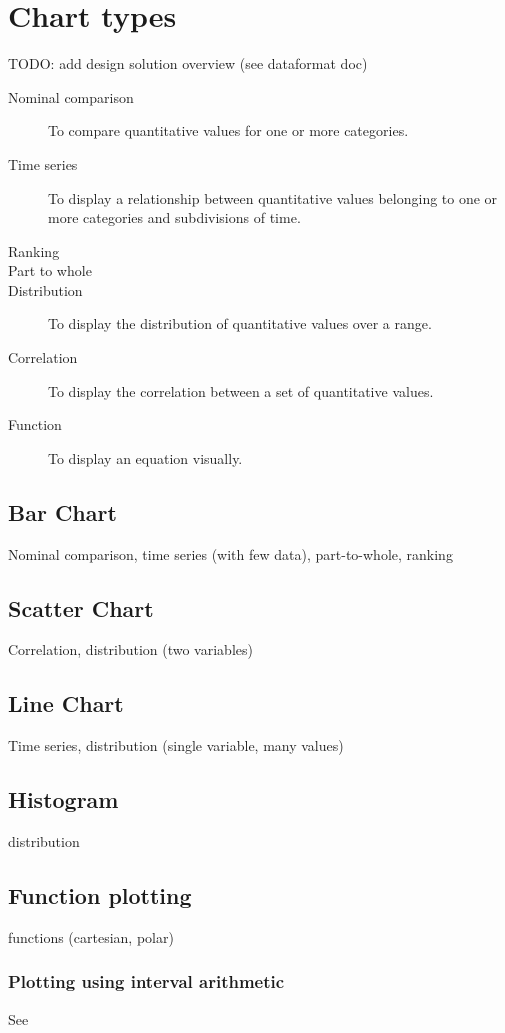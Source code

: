 \chapter{Chart types}

TODO: add design solution overview (see dataformat doc)
\begin{description}
\item[Nominal comparison] To compare quantitative values for one or more categories.
\item[Time series] To display a relationship between quantitative values belonging to one or more categories and subdivisions of time.
\item[Ranking]
\item[Part to whole]
\item[Distribution] To display the distribution of quantitative values over a range.
\item[Correlation] To display the correlation between a set of quantitative values.
\item[Function] To display an equation visually.
\end{description}

\section{Bar Chart}
Nominal comparison, time series (with few data), part-to-whole, ranking

\section{Scatter Chart}
Correlation, distribution (two variables)

\section{Line Chart}
Time series, distribution (single variable, many values)

\section{Histogram}
distribution

\section{Function plotting}
functions (cartesian, polar)

\subsection{Plotting using interval arithmetic}
See \cite{shou05, fateman92, martin02}
